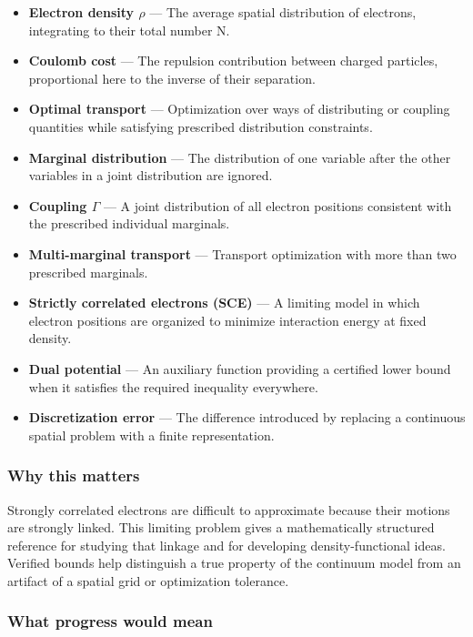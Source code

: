 \documentclass[
  11pt,
]{article}
\begin{document}
\begin{itemize}
\item
  \textbf{Electron density \ensuremath{\rho}} --- The average spatial
  distribution of electrons, integrating to their total number N.
\item
  \textbf{Coulomb cost} --- The repulsion contribution between charged
  particles, proportional here to the inverse of their separation.
\item
  \textbf{Optimal transport} --- Optimization over ways of distributing
  or coupling quantities while satisfying prescribed distribution
  constraints.
\item
  \textbf{Marginal distribution} --- The distribution of one variable
  after the other variables in a joint distribution are ignored.
\item
  \textbf{Coupling \ensuremath{\Gamma}} --- A joint distribution of all
  electron positions consistent with the prescribed individual
  marginals.
\item
  \textbf{Multi-marginal transport} --- Transport optimization with more
  than two prescribed marginals.
\item
  \textbf{Strictly correlated electrons (SCE)} --- A limiting model in
  which electron positions are organized to minimize interaction energy
  at fixed density.
\item
  \textbf{Dual potential} --- An auxiliary function providing a
  certified lower bound when it satisfies the required inequality
  everywhere.
\item
  \textbf{Discretization error} --- The difference introduced by
  replacing a continuous spatial problem with a finite representation.
\end{itemize}

\subsubsection{Why this matters}

Strongly correlated electrons are difficult to approximate because their
motions are strongly linked. This limiting problem gives a
mathematically structured reference for studying that linkage and for
developing density-functional ideas. Verified bounds help distinguish a
true property of the continuum model from an artifact of a spatial grid
or optimization tolerance.

\subsubsection{What progress would mean}
\end{document}
